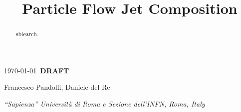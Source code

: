 \documentclass{cmspaper}
\begin{document}
\renewcommand{\arraystretch}{1.7}

\begin{titlepage}
\today ~{\bf DRAFT}
\boldmath \title{
Particle Flow Jet Composition
} \unboldmath
\begin{Authlist}
Francesco Pandolfi, Daniele del Re
%
\begin{center}
 \begin{small}
 {\it ``Sapienza'' Universit\`{a} di Roma e Sezione dell'INFN, Roma, Italy} \\
\end{small}
\end{center}
\end{Authlist}
%
\begin{abstract}
sblearch.
\end{abstract} 
\end{titlepage}
\tableofcontents
\newpage
\end{document}
